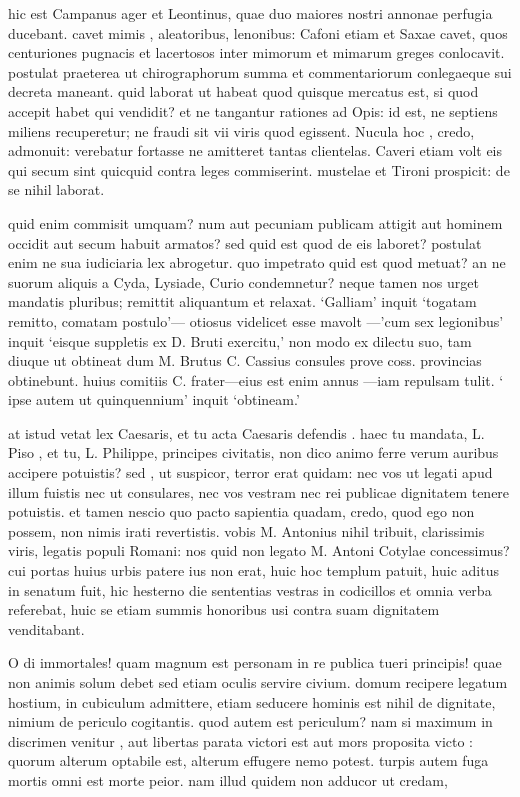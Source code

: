  hic est Campanus ager et Leontinus, quae duo maiores nostri annonae perfugia ducebant. cavet mimis , aleatoribus, lenonibus: Cafoni etiam et Saxae cavet, quos centuriones pugnacis et lacertosos inter mimorum et mimarum greges conlocavit. postulat praeterea ut chirographorum summa et commentariorum conlegaeque sui decreta maneant. quid laborat ut habeat quod quisque mercatus est, si quod accepit habet qui vendidit? et ne tangantur rationes ad Opis: id est, ne septiens miliens recuperetur; ne fraudi sit vii viris quod egissent. Nucula hoc , credo, admonuit: verebatur fortasse ne amitteret tantas clientelas. Caveri etiam volt eis qui secum sint quicquid contra leges commiserint. mustelae et Tironi prospicit: de se nihil laborat.

 quid enim commisit umquam? num aut pecuniam publicam attigit aut hominem occidit aut secum habuit armatos? sed quid est quod de eis laboret? postulat enim ne sua iudiciaria lex abrogetur. quo impetrato quid est quod metuat? an ne suorum aliquis a Cyda, Lysiade, Curio condemnetur? neque tamen nos urget mandatis pluribus; remittit aliquantum et relaxat. `Galliam' inquit `togatam remitto, comatam postulo'— otiosus videlicet esse mavolt —'cum sex legionibus' inquit `eisque suppletis ex D. Bruti exercitu,' non modo ex dilectu suo, tam diuque ut obtineat dum M. Brutus C. Cassius consules prove coss. provincias obtinebunt. huius comitiis C. frater—eius est enim annus —iam repulsam tulit. ` ipse autem ut quinquennium' inquit `obtineam.'

 at istud vetat lex Caesaris, et tu acta Caesaris defendis . haec tu mandata, L. Piso , et tu, L. Philippe, principes civitatis, non dico animo ferre verum auribus accipere potuistis? sed , ut suspicor, terror erat quidam: nec vos ut legati apud illum fuistis nec ut consulares, nec vos vestram nec rei publicae dignitatem tenere potuistis. et tamen nescio quo pacto sapientia quadam, credo, quod ego non possem, non nimis irati revertistis. vobis M. Antonius nihil tribuit, clarissimis viris, legatis populi Romani: nos quid non legato M. Antoni Cotylae concessimus? cui portas huius urbis patere ius non erat, huic hoc templum patuit, huic aditus in senatum fuit, hic hesterno die sententias vestras in codicillos et omnia verba referebat, huic se etiam summis honoribus usi contra suam dignitatem venditabant.

 O di immortales! quam magnum est personam in re publica tueri principis! quae non animis solum debet sed etiam oculis servire civium. domum recipere legatum hostium, in cubiculum admittere, etiam seducere hominis est nihil de dignitate, nimium de periculo cogitantis. quod autem est periculum? nam si maximum in discrimen venitur , aut libertas parata victori est aut mors proposita victo : quorum alterum optabile est, alterum effugere nemo potest. turpis autem fuga mortis omni est morte peior. nam illud quidem non adducor ut credam,

